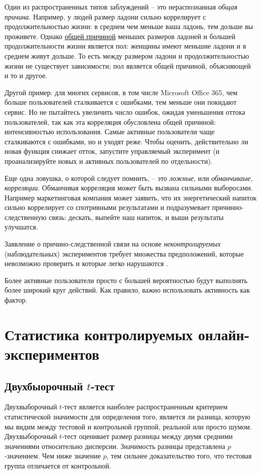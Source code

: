 \documentclass[%
	11pt,
	a4paper,
	utf8,
		]{article}
\begin{document}
Один из распространенных типов заблуждений -- это нераспознанная \emph{общая причина}. Например, у людей размер ладони сильно коррелирует с продолжительностью жизни: в среднем чем меньше ваша ладонь, тем дольше вы проживете. Однако \underline{общей причиной} меньших размеров ладоней и большей продолжительности жизни является пол: женщины имеют меньшие ладони и в среднем живут дольше. То есть между размером ладони и продолжительностью жизни не существует зависимости; пол является общей причиной, объясняющей и то и другое.

Другой пример: для многих сервисов, в том числе Microsoft Office 365, чем больше пользователей сталкивается с ошибками, тем меньше они покидают сервис. Но не пытайтесь увеличить число ошибок, ожидая уменьшения оттока пользователей, так как эта корреляция обусловлена общей причиной: интенсивностью использования. Самые активные пользователи чаще сталкиваются с ошибками, но и уходят реже. Чтобы оценить, действительно ли новая функция снижает отток, запустите управляемый эксперимент (и проанализируйте новых и активных пользователей по отдельности).

Еще одна ловушка, о которой следует помнить, -- это \emph{ложные}, или \emph{обманчиваые, корреляции}. Обманчивая корреляция может быть вызвана сильными выборосами. Например маркетинговая компания может заявить, что их энергетический напиток сильно коррелирует со спотривными результатами и подразумевает причинно-следственную связь: дескать, выпейте наш напиток, и выши результаты улучшатся.

{\color{red}Заявление о причино-следственной связи на основе \emph{неконтролируемых} (наблюдательных) экспериментов требует множества предположений, которые невозможно проверить и которые легко нарушаются} \cite[]{kohavi:ab-tests-2021}. 

Более активные пользователи просто с большей вероятностью будут выполнять более широкий круг действий. Как правило, важно использовать активность как фактор.

\section{Статистика контролируемых онлайн-экспериментов}

\subsection{Двухбыорочный $t$-тест}

Двухвыборочный $t$-тест является наиболее распространенным критерием статистической значимости для определения того, является ли разница, которую мы видим между тестовой и контрольной группой, реальной или просто шумом. Двухвыборочный $t$-тест оценивает размер разницы между двумя средними значениями относительно дисперсии. Значимость разницы представлена $p$-значением. Чем ниже значение $p$, тем сильнее доказательство того, что тестовая группа отличается от контрольной.
\end{document}
